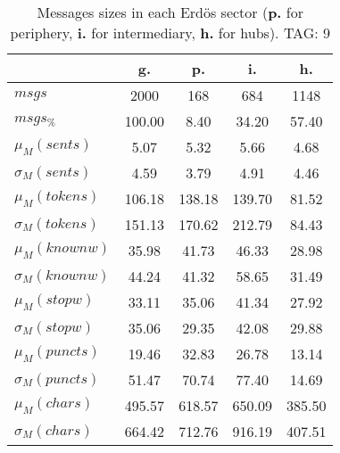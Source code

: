 \begin{table}[h!]
\begin{center}
\begin{tabular}{| l | c | c | c | c |}\hline
 & g. & p. & i. & h. \\\hline
$msgs$ & 2000  & 168  & 684  & 1148 \\\hline
$msgs_{\%}$ & 100.00  & 8.40  & 34.20  & 57.40 \\\hline
$\mu_M(sents)$ & 5.07  & 5.32  & 5.66  & 4.68 \\\hline
$\sigma_M(sents)$ & 4.59  & 3.79  & 4.91  & 4.46 \\\hline
$\mu_M(tokens)$ & 106.18  & 138.18  & 139.70  & 81.52 \\\hline
$\sigma_M(tokens)$ & 151.13  & 170.62  & 212.79  & 84.43 \\\hline
$\mu_M(knownw)$ & 35.98  & 41.73  & 46.33  & 28.98 \\\hline
$\sigma_M(knownw)$ & 44.24  & 41.32  & 58.65  & 31.49 \\\hline
$\mu_M(stopw)$ & 33.11  & 35.06  & 41.34  & 27.92 \\\hline
$\sigma_M(stopw)$ & 35.06  & 29.35  & 42.08  & 29.88 \\\hline
$\mu_M(puncts)$ & 19.46  & 32.83  & 26.78  & 13.14 \\\hline
$\sigma_M(puncts)$ & 51.47  & 70.74  & 77.40  & 14.69 \\\hline
$\mu_M(chars)$ & 495.57  & 618.57  & 650.09  & 385.50 \\\hline
$\sigma_M(chars)$ & 664.42  & 712.76  & 916.19  & 407.51 \\\hline
\end{tabular}
\caption{Messages sizes in each Erd\"os sector ({{\bf p.}} for periphery, {{\bf i.}} for intermediary, {{\bf h.}} for hubs). TAG: 9}
\end{center}
\end{table}